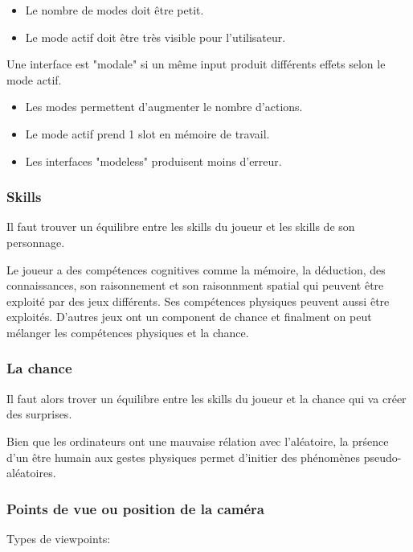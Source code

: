\begin{itemize}
\item Le nombre de modes doit \^etre petit.
\item Le mode actif doit \^etre tr\`es visible pour l'utilisateur.
\end{itemize}

Une interface est "modale" si un m\^eme input produit diff\'erents effets selon le mode actif.

\begin{itemize}
\item Les modes permettent d'augmenter le nombre d'actions.
\item Le mode actif prend 1 slot en m\'emoire de travail.
\item Les interfaces "modeless" produisent moins d'erreur.
\end{itemize}

\subsubsection{Skills}

Il faut trouver un \'equilibre entre les skills du joueur et les skills de son personnage. 

Le joueur a des comp\'etences cognitives comme la m\'emoire, la d\'eduction, des connaissances, son raisonnement et son raisonnment spatial qui peuvent \^etre exploit\'e par des jeux diff\'erents. Ses comp\'etences physiques peuvent aussi \^etre exploit\'es. D'autres jeux ont un component de chance et finalment on peut m\'elanger les comp\'etences physiques et la chance.

\subsubsection{La chance}

Il faut alors trover un \'equilibre entre les skills du joueur et la chance qui va cr\'eer des surprises.

Bien que les ordinateurs ont une mauvaise r\'elation avec l'al\'eatoire, la pr\'sence d'un \^etre humain aux gestes physiques permet d'initier des ph\'enom\`enes pseudo-al\'eatoires.

\subsubsection{Points de vue ou position de la cam\'era}

Types de viewpoints:

